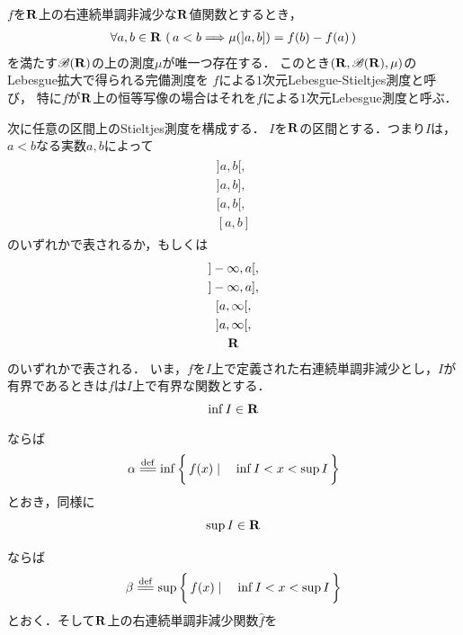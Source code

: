 	\begin{screen}
		\begin{dfn}
			$f$を$\mathbf{R}$上の右連続単調非減少な$\mathbf{R}$値関数とするとき，
			\begin{align}
				\forall a,b \in \mathbf{R}\, \left(\, a < b \Longrightarrow \mu(]a,b]) = f(b) - f(a)\, \right)
			\end{align}
			を満たす$\mathscr{B}(\mathbf{R})$の上の測度$\mu$が唯一つ存在する．
			このとき$(\mathbf{R},\mathscr{B}(\mathbf{R}),\mu)$のLebesgue拡大で得られる完備測度を
			$f$による$1$次元Lebesgue-Stieltjes測度と呼び，
			特に$f$が$\mathbf{R}$上の恒等写像の場合はそれを$f$による$1$次元Lebesgue測度と呼ぶ．
		\end{dfn}
	\end{screen}
	
	次に任意の区間上のStieltjes測度を構成する．
	$I$を$\mathbf{R}$の区間とする．つまり$I$は，$a < b$なる実数$a,b$によって
	\begin{align}
		\begin{gathered}
			]a,b[, \\
			]a,b],\\ 
			[a,b[,\\ 
			[a,b]
		\end{gathered}
	\end{align}
	のいずれかで表されるか，もしくは
	\begin{align}
		\begin{gathered}
			]-\infty,a[, \\
			]-\infty,a], \\
			[a,\infty[, \\
			]a,\infty[, \\
			\mathbf{R}
		\end{gathered}
	\end{align}
	のいずれかで表される．
	いま，$f$を$I$上で定義された右連続単調非減少とし，$I$が有界であるときは$f$は$I$上で有界な関数とする．
	\begin{align}
		\operatorname*{inf}_{} I \in \mathbf{R}
	\end{align}
	ならば
	\begin{align}
		\alpha \defeq \inf{}{\Set{f(x)}{\inf{}{I} < x < \sup{}{I}}}
	\end{align}
	とおき，同様に
	\begin{align}
		\operatorname*{sup}_{} I \in \mathbf{R}
	\end{align}
	ならば
	\begin{align}
		\beta \defeq \sup{}{\Set{f(x)}{\inf{}{I} < x < \sup{}{I}}}
	\end{align}
	とおく．そして$\mathbf{R}$上の右連続単調非減少関数$\hat{f}$を
